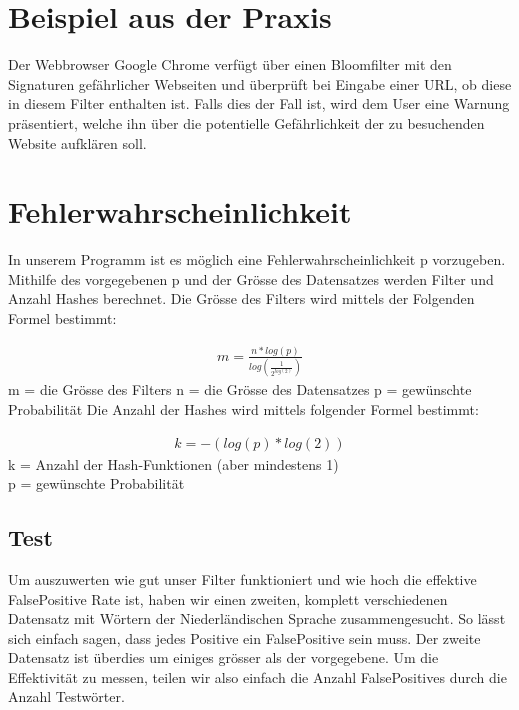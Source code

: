 \documentclass[11pt]{article}
\begin{document}
    \section{Beispiel aus der Praxis}
    Der Webbrowser Google Chrome verf{\"u}gt {\"u}ber einen Bloomfilter mit den Signaturen gef{\"a}hrlicher Webseiten und {\"u}berpr{\"u}ft bei Eingabe einer URL, ob diese in diesem Filter enthalten ist.
    Falls dies der Fall ist, wird dem User eine Warnung pr{\"a}sentiert, welche ihn {\"u}ber die potentielle Gef{\"a}hrlichkeit der zu besuchenden Website aufkl{\"a}ren soll.

    \section{Fehlerwahrscheinlichkeit}
    In unserem Programm ist es m{\"o}glich eine Fehlerwahrscheinlichkeit p vorzugeben.
    Mithilfe des vorgegebenen p und der Gr{\"o}sse des Datensatzes werden Filter und Anzahl Hashes berechnet.
    Die Gr{\"o}sse des Filters wird mittels der Folgenden Formel bestimmt:

     \begin{align*}
        m = \frac{n * log(p)}{log(\frac{1}{2^{log(2)}})}
    \end{align*}
    \newline
    m = die Gr{\"o}sse des Filters
    \newline
    n = die Gr{\"o}sse des Datensatzes
    \newline
    p = gew{\"u}nschte Probabilit{\"a}t
    \medskip
    \newline
    Die Anzahl der Hashes wird mittels folgender Formel bestimmt:

    \begin{align*}
        k = -(log(p) * log(2))
    \end{align*}
    \smallskip
    k = Anzahl der Hash-Funktionen (aber mindestens 1)
    \\
    p = gew{\"u}nschte Probabilit{\"a}t
    \medskip

    \subsection{Test}
    Um auszuwerten wie gut unser Filter funktioniert und wie hoch die effektive FalsePositive Rate ist,
    haben wir einen zweiten, komplett verschiedenen Datensatz mit W{\"o}rtern der Niederl{\"a}ndischen Sprache zusammengesucht.
    So l{\"a}sst sich einfach sagen, dass jedes Positive ein FalsePositive sein muss. Der zweite Datensatz ist {\"u}berdies um einiges
    gr{\"o}sser als der vorgegebene. Um die Effektivit{\"a}t zu messen, teilen wir also einfach die Anzahl FalsePositives durch die Anzahl
    Testw{\"o}rter.
\end{document}
